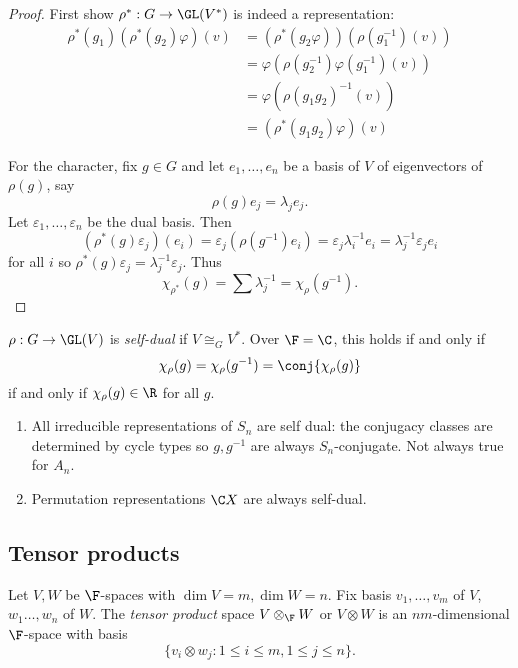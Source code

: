 \documentclass[a4paper]{article}
\begin{document}
\begin{proof}
  First show \(\rho^*: G \to \GL(V^*)\) is indeed a representation:
  \begin{align*}
    \rho^*(g_1) (\rho^*(g_2) \varphi)(v)
    &= (\rho^*(g_2\varphi)) (\rho(g_1^{-1}) (v)) \\
    &= \varphi(\rho(g_2^{-1}) \varphi(g_1^{-1})(v)) \\
    &= \varphi(\rho(g_1g_2)^{-1} (v)) \\
    &= (\rho^*(g_1g_2) \varphi)(v)
  \end{align*}

  For the character, fix \(g \in G\) and let \(e_1, \dots, e_n\) be a basis of \(V\) of eigenvectors of \(\rho(g)\), say
  \[
    \rho(g) e_j = \lambda_j e_j.
  \]
  Let \(\varepsilon_1, \dots, \varepsilon_n\) be the dual basis. Then
  \[
    (\rho^*(g) \varepsilon_j)(e_i)
    = \varepsilon_j (\rho(g^{-1}) e_i)
    = \varepsilon_j \lambda_i^{-1} e_i
    = \lambda_j^{-1} \varepsilon_j e_i
  \]
  for all \(i\) so \(\rho^*(g) \varepsilon_j = \lambda_j^{-1} \varepsilon_j\). Thus
  \[
    \chi_{\rho^*}(g) = \sum \lambda_j^{-1} = \chi_\rho (g^{-1}).
  \]
\end{proof}

\begin{definition}
  \(\rho: G \to \GL(V)\) is \emph{self-dual} if \(V \cong_G V^*\). Over \(\F = \C\), this holds if and only if
  \[
    \chi_\rho(g) = \chi_\rho(g^{-1}) = \conj{\chi_\rho(g)}
  \]
  if and only if \(\chi_\rho(g) \in \R\) for all \(g\).
\end{definition}

\begin{eg}\leavevmode
  \begin{enumerate}
  \item All irreducible representations of \(S_n\) are self dual: the conjugacy classes are determined by cycle types so \(g, g^{-1}\) are always \(S_n\)-conjugate. Not always true for \(A_n\).
  \item Permutation representations \(\C X\) are always self-dual.
  \end{enumerate}
\end{eg}

\subsection{Tensor products}

\begin{definition}
  Let \(V, W\) be \(\F\)-spaces with \(\dim V = m, \dim W = n\). Fix basis \(v_1, \dots, v_m\) of \(V\), \(w_1 \dots, w_n\) of \(W\). The \emph{tensor product} space \(V \otimes_\F W\) or \(V \otimes W\) is an \(nm\)-dimensional \(\F\)-space with basis
  \[
    \{v_i \otimes w_j: 1 \leq i \leq m, 1 \leq j \leq n \}.
  \]
\end{definition}
\end{document}
